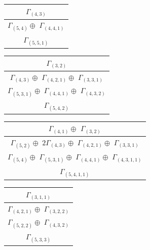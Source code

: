 \documentclass[main.tex]{subfiles}
\begin{document}
\begin{minipage}{.2\textwidth}
\centering
\begin{tabular}{c}
$\Gamma_{(
4 , 
3
)}$
\\ \hline
$\Gamma_{(
5 , 
4
)} \oplus$
$\Gamma_{(
4 , 
4 , 
1
)}$
\\ \hline
$\Gamma_{(
5 , 
5 , 
1
)}$
\\
\end{tabular}\end{minipage}
\begin{minipage}{.3\textwidth}
\centering
\begin{tabular}{c}
$\Gamma_{(
3 , 
2
)}$
\\ \hline
$\Gamma_{(
4 , 
3
)} \oplus$
$\Gamma_{(
4 , 
2 , 
1
)} \oplus$
$\Gamma_{(
3 , 
3 , 
1
)}$
\\ \hline
$\Gamma_{(
5 , 
3 , 
1
)} \oplus$
$\Gamma_{(
4 , 
4 , 
1
)} \oplus$
$\Gamma_{(
4 , 
3 , 
2
)}$
\\ \hline
$\Gamma_{(
5 , 
4 , 
2
)}$
\\
\end{tabular}\end{minipage}
\begin{minipage}{.3\textwidth}
\centering
\begin{tabular}{c}
$\Gamma_{(
4 , 
1
)} \oplus$
$\Gamma_{(
3 , 
2
)}$
\\ \hline
$\Gamma_{(
5 , 
2
)} \oplus$
$2\Gamma_{(
4 , 
3
)} \oplus$
$\Gamma_{(
4 , 
2 , 
1
)} \oplus$
$\Gamma_{(
3 , 
3 , 
1
)}$
\\ \hline
$\Gamma_{(
5 , 
4
)} \oplus$
$\Gamma_{(
5 , 
3 , 
1
)} \oplus$
$\Gamma_{(
4 , 
4 , 
1
)} \oplus$
$\Gamma_{(
4 , 
3 , 
1 , 
1
)}$
\\ \hline
$\Gamma_{(
5 , 
4 , 
1 , 
1
)}$
\\
\end{tabular}\end{minipage}
\bigskip
\begin{minipage}{.2\textwidth}
\centering
\begin{tabular}{c}
$\Gamma_{(
3 , 
1 , 
1
)}$
\\ \hline
$\Gamma_{(
4 , 
2 , 
1
)} \oplus$
$\Gamma_{(
3 , 
2 , 
2
)}$
\\ \hline
$\Gamma_{(
5 , 
2 , 
2
)} \oplus$
$\Gamma_{(
4 , 
3 , 
2
)}$
\\ \hline
$\Gamma_{(
5 , 
3 , 
3
)}$
\\
\end{tabular}\end{minipage}
\end{document}
